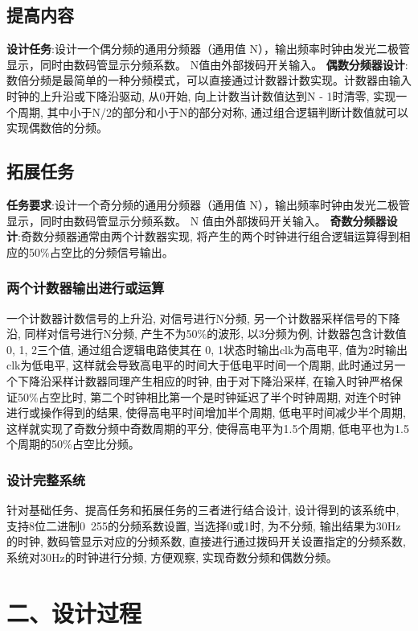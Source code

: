 \documentclass{article}
\newcommand{\fourhao}{\fontsize{14pt}{\baselineskip}\selectfont} %
\newcommand{\xiaosihao}{\fontsize{12pt}{\baselineskip}\selectfont} %
\begin{document}
\subsection*{提高内容}
\textbf{设计任务}:设计一个偶分频的通用分频器（通用值 N），输出频率时钟由发光二极管显示，同时由数码管显示分频系数。
N值由外部拨码开关输入。
\textbf{偶数分频器设计}:数倍分频是最简单的一种分频模式，可以直接通过计数器计数实现。计数器由输入时钟的上升沿或下降沿驱动, 
从0开始, 向上计数当计数值达到N - 1时清零, 实现一个周期, 其中小于N/2的部分和小于N的部分对称, 通过组合逻辑判断计数值就可以
实现偶数倍的分频。
\subsection*{拓展任务}
\textbf{任务要求}:设计一个奇分频的通用分频器（通用值 N），输出频率时钟由发光二极管显示，同时由数码管显示分频系数。
N 值由外部拨码开关输入。
\textbf{奇数分频器设计}:奇数分频器通常由两个计数器实现, 将产生的两个时钟进行组合逻辑运算得到相应的50\%占空比的分频信号输出。\\
\subsubsection*{两个计数器输出进行或运算}
一个计数器计数信号的上升沿, 对信号进行N分频, 另一个计数器采样信号的下降沿, 同样对信号进行N分频, 产生不为50\%的波形, 以3分频为例, 计数器包含计数值0, 1, 2三个值, 通过组合逻辑电路使其在
0, 1状态时输出clk为高电平, 值为2时输出clk为低电平, 这样就会导致高电平的时间大于低电平时间一个周期, 此时通过另一个下降沿采样计数器同理产生相应的时钟, 由于对下降沿采样, 在输入时钟严格保证50\%占空比时, 第二个时钟相比第一个是时钟延迟了半个时钟周期, 
对连个时钟进行或操作得到的结果, 使得高电平时间增加半个周期, 低电平时间减少半个周期, 这样就实现了奇数分频中奇数周期的平分, 使得高电平为1.5个周期, 低电平也为1.5个周期的50\%占空比分频。 
\subsubsection*{设计完整系统}
针对基础任务、提高任务和拓展任务的三者进行结合设计, 设计得到的该系统中, 支持8位二进制0~255的分频系数设置, 当选择0或1时, 为不分频, 输出结果为30Hz的时钟, 数码管显示对应的分频系数, 
直接进行通过拨码开关设置指定的分频系数, 系统对30Hz的时钟进行分频, 方便观察, 实现奇数分频和偶数分频。

\section*{\fourhao 二、设计过程}
\xiaosihao
{}
\end{document}
